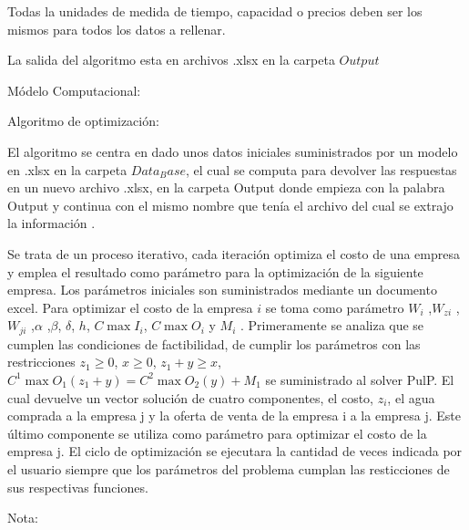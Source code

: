 \documentclass{article}
\begin{document}
Todas la unidades de medida de tiempo, capacidad o precios deben ser los mismos para todos los datos a rellenar.


\begin{center}
   La salida del algoritmo esta en archivos .xlsx en la carpeta $Output$
\end{center}


\begin{center}
\vspace{1cm}
{\Large M\'odelo Computacional:}
\end{center}


\vspace{1.0cm}
 \begin{center}
 {\Large Algoritmo de optimización:}
 \end{center}


El algoritmo se centra en dado unos datos iniciales suministrados por un modelo en .xlsx en la carpeta $ Data_Base$,
 el cual se computa para devolver las respuestas en un nuevo archivo .xlsx, en la carpeta Output donde empieza con
  la palabra Output y continua con el mismo nombre que ten\'ia el archivo del cual se extrajo la informaci\'on .
  
 Se trata de un proceso iterativo, cada iteraci\'on optimiza el costo de  una empresa  y emplea el resultado como par\'ametro para la optimizaci\'on de la siguiente  empresa. Los par\'ametros iniciales son suministrados mediante un documento excel. Para optimizar el costo de la empresa $i$ se toma como par\'ametro $ W_{i}$ ,$ W_{zi}$ ,$ W_{ji}$ ,$ \alpha $ ,$ \beta $, $ \delta $, $h$, $ C\max{I_{i}}$, $ C\max{O_{i }} $ y $ M_i $ . Primeramente se analiza que se cumplen las condiciones de factibilidad, de cumplir los par\'ametros con las restricciones $z_1 \geq 0$, $x\geq 0$,
$z_1 + y \geq x$, $C^1 \max{O_{1}} (z_1 + y) =  C^2 \max{O_{2}} (y) + M_1 $ se suministrado al solver PulP. El cual devuelve un vector soluci\'on de cuatro componentes, el costo, $z_i$, el agua comprada a la empresa j y la oferta de venta de la empresa i a la empresa j. Este \'ultimo componente se utiliza como par\'ametro para optimizar el costo de la empresa j. El ciclo de optimizaci\'on se ejecutara la cantidad de veces indicada por el usuario siempre que los par\'ametros del problema cumplan las resticciones de sus respectivas funciones.
  \begin{center}
    \vspace{1cm}
    \Large{Nota:}
  \end{center}
\end{document}
